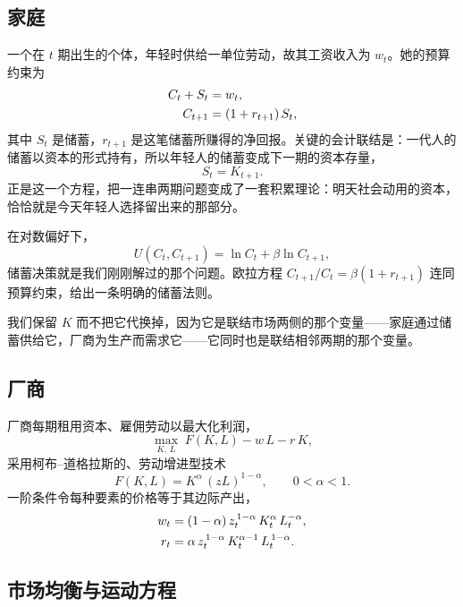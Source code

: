 \subsection{家庭}

一个在 $t$ 期出生的个体，年轻时供给一单位劳动，故其工资收入为 $w_t$。她的预算约束为
\[
\begin{aligned}
C_t + S_t &= w_t, \\
C_{t+1} &= (1+r_{t+1})\,S_t,
\end{aligned}
\]
其中 $S_t$ 是储蓄，$r_{t+1}$ 是这笔储蓄所赚得的净回报。关键的会计联结是：一代人的储蓄以资本的形式持有，所以年轻人的储蓄变成下一期的资本存量，
\[
S_t = K_{t+1}.
\]
正是这一个方程，把一连串两期问题变成了一套积累理论：明天社会动用的资本，恰恰就是今天年轻人选择留出来的那部分。

在对数偏好下，
\[
U(C_t, C_{t+1}) = \ln C_t + \beta \ln C_{t+1},
\]
储蓄决策就是我们刚刚解过的那个问题。欧拉方程 $C_{t+1}/C_t = \beta(1+r_{t+1})$ 连同预算约束，给出一条明确的储蓄法则。


我们保留 $K$ 而不把它代换掉，因为它是联结市场两侧的那个变量——家庭通过储蓄供给它，厂商为生产而需求它——它同时也是联结相邻两期的那个变量。

\subsection{厂商}

厂商每期租用资本、雇佣劳动以最大化利润，
\[
\max_{K,\,L}\; F(K, L) - w\,L - r\,K,
\]
采用柯布--道格拉斯的、劳动增进型技术
\[
F(K, L) = K^{\alpha}\,(zL)^{1-\alpha}, \qquad 0 < \alpha < 1.
\]
一阶条件令每种要素的价格等于其边际产出，
\[
\begin{aligned}
w_t &= (1-\alpha)\,z_t^{\,1-\alpha}\, K_t^{\alpha}\, L_t^{-\alpha}, \\
r_t &= \alpha\,z_t^{\,1-\alpha}\, K_t^{\alpha-1}\, L_t^{\,1-\alpha}.
\end{aligned}
\]

\subsection{市场均衡与运动方程}

